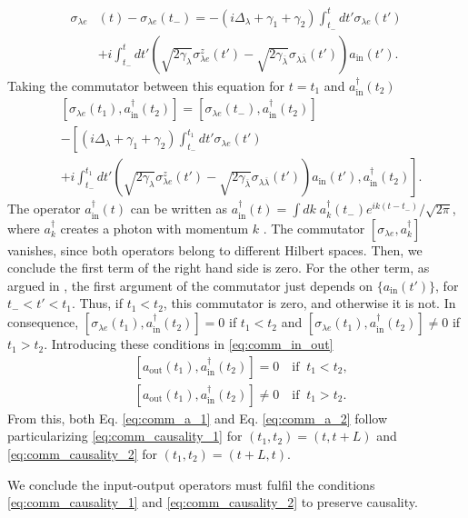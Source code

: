 \documentclass[notitlepage, prx, preprint, amsmath,superscriptaddress,amssymb]{revtex4-1}
\begin{document}
\begin{align}
\label{eq:sigma_inout_int}
\sigma_{\lambda e}&(t)-\sigma_{\lambda e}(t_-)=-(i\Delta_\lambda+\gamma_1+\gamma_2)\int_{t_-}^t dt'\sigma_{\lambda e}(t')\nonumber\\
&+i\int_{t_-}^t dt' \left(\sqrt{2\gamma_\lambda}\sigma_{\lambda e}^z(t')- \sqrt{2\gamma_{\overline{\lambda}}}\sigma_{\lambda \overline{\lambda}}(t')\right)a_\text{in}(t').
\end{align}
Taking the commutator between this equation for $t=t_1$ and $a_\text{in}^\dagger(t_2)$
\begin{align}
&[\sigma_{\lambda e}(t_1),a_\text{in}^\dagger(t_2)]=[\sigma_{\lambda e}(t_-),a_\text{in}^\dagger(t_2)]\nonumber\\
&-\left[(i\Delta_\lambda+\gamma_1+\gamma_2)\int_{t_-}^{t_1} dt'\sigma_{\lambda e}(t') \right.\nonumber\\
&\left.+i\int_{t_-}^{t_1} dt' \left(\sqrt{2\gamma_\lambda}\sigma_{\lambda e}^z(t')- \sqrt{2\gamma_{\overline{\lambda}}}\sigma_{\lambda \overline{\lambda}}(t')\right)a_\text{in}(t'),a_\text{in}^\dagger(t_2)\right].
\end{align}
The operator $a_\text{in}^\dagger(t)$ can be written as $a_\text{in}^\dagger(t)=\int dk\; a_k^\dagger (t_-)e^{ik(t-t_-)}/\sqrt{2\pi}$, where $a_k^\dagger$ creates a photon with momentum $k$ \cite{Fan2010}. The commutator $[\sigma_{\lambda e},a_k^\dagger]$ vanishes, since both operators belong to different Hilbert spaces. Then, we conclude the first term of the right hand side is zero. For the other term, as argued in \cite{Xu2015}, the first argument of the commutator just depends on $\{a_\text{in}(t')\}$, for $t_-<t'<t_1$. Thus, if $t_1<t_2$, this commutator is zero, and otherwise it is not. In consequence, $[\sigma_{\lambda e}(t_1),a_\text{in}^\dagger(t_2)]=0$ if $t_1<t_2$ and $[\sigma_{\lambda e}(t_1),a_\text{in}^\dagger(t_2)]\neq 0$ if $t_1>t_2$. Introducing these conditions in \eqref{eq:comm_in_out}
\begin{align}
\label{eq:comm_causality_1}&[a_\text{out}(t_1),a_\text{in}^\dagger(t_2)]=0\quad \text{if}\;\; t_1<t_2,\\
\label{eq:comm_causality_2}&[a_\text{out}(t_1),a_\text{in}^\dagger(t_2)]\neq 0\quad \text{if}\;\; t_1>t_2.
\end{align}
From this, both Eq. \eqref{eq:comm_a_1} and Eq. \eqref{eq:comm_a_2} follow particularizing \eqref{eq:comm_causality_1} for $(t_1,t_2)=(t,t+L)$ and \eqref{eq:comm_causality_2} for $(t_1,t_2)=(t+L,t)$.

We conclude the input-output operators must fulfil the conditions \eqref{eq:comm_causality_1} and \eqref{eq:comm_causality_2} to preserve causality.%
\end{document}
